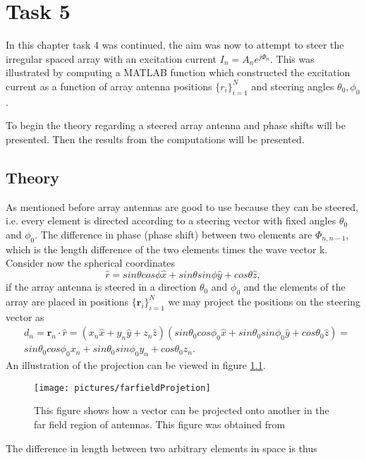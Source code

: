 \chapter{Task 5}
In this chapter task 4 was continued, the aim was now to attempt to steer the irregular spaced array with an excitation current $I_n  = A_n e^{j\Phi_n}$. This was illustrated by computing a MATLAB function which constructed the excitation current as a function of array antenna positions $\{r_i\}_{i=1}^N$  and steering angles $\theta_0, \phi_0$.

To begin the theory regarding a steered array antenna  and phase shifts will be presented. Then the results from the computations will be presented. 

\section{Theory}
As mentioned before array antennas are good to use because they can be steered, i.e. every element is directed according to a steering vector with fixed angles $\theta_0$ and $\phi_0$. The difference in phase (phase shift) between two elements are $\Phi_{n, n-1}$, which is the length difference of the two elements times the wave vector k. Consider now the spherical coordinates 
\begin{equation}
\hat{r} = sin\theta cos\phi \hat{x} + sin\theta sin\phi \hat{y} + cos\theta \hat{z},
\end{equation}
if the array antenna is steered in a direction $\theta_0$ and $\phi_0$ and the elements of the array are placed in positions $\{\mathbf{r}_i \}_{i=1}^N$ we may project the positions on the steering vector as 
\begin{align}
& d_n = \mathbf{r}_n \cdot \hat{r} = (x_n\hat{x}+ y_n\hat{y} + z_n\hat{z}) (sin\theta_0 cos\phi_0 \hat{x} + sin\theta_0 sin\phi_0 \hat{y} + cos\theta_0 \hat{z})= \\
& sin\theta_0 cos\phi_0 x_n + sin\theta_0 sin\phi_0 y_n + cos\theta_0 z_n.
\end{align}
An illustration of the projection can be viewed in figure \ref{fig:farfieldProjetion}.
\begin{figure}
\centering
\texttt{[image: pictures/farfieldProjetion]}
\caption{This figure shows how a vector can be projected onto another in the far field region of antennas. This figure was obtained from \cite{kildal2000foundations}}
\label{fig:farfieldProjetion}
\end{figure}
The difference in length between two arbitrary elements in space is thus
